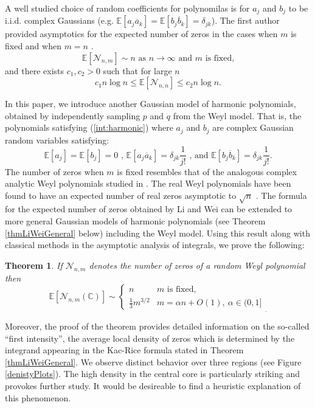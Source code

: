 \documentclass[12pt]{amsart}
\newtheorem{theorem}{Theorem}
\theoremstyle{remark}
\begin{document}
A well studied choice  of random coefficients for polynomilas is for $a_j$ and $b_j$ to be i.i.d. complex Gaussians (e.g. $\mathbb{E}[a_j\overline{a}_k]=\mathbb{E}[b_j\overline{b}_k]=\delta_{jk}$).  The first author provided asymptotics for the expected number of zeros in the cases when $m$ is fixed and when $m = n$ \cite{Thomack}.
\[\mathbb{E}[\mathcal{N}_{n,m}]\sim n\text{ as $n\rightarrow\infty$ and $m$ is fixed,}\] 
and there exists $c_1,c_2>0$ such that for large $n$
\[c_1n\log n\le\mathbb{E}[\mathcal{N}_{n,n}]\le c_2n\log n.\]

In this paper, we introduce another Gaussian model of harmonic polynomials, obtained by independently sampling $p$ and $q$ from the Weyl model.  That is, the polynomials satisfying (\ref{int:harmonic}) where $a_j$ and $b_j$ are complex Gaussian random variables satisfying:
\begin{equation}
	\mathbb{E}[a_j]=\mathbb{E}[b_j]=0\text{ , }\mathbb{E}[a_j\overline{a}_k]
	=\delta_{jk}\frac{1}{j!}\text{ , and }\mathbb{E}[b_j\overline{b}_k]
	=\delta_{jk}\frac{1}{j!}.
\end{equation}
The number of zeros when $m$ is fixed resembles that of the analogous complex analytic Weyl polynomials studied in \cite{Tao}.  The real Weyl polynomials have been found to have an expected number of real zeros asymptotic to $\sqrt{n}$ \cite{Kostlan}.
The formula for the expected number of zeros obtained by Li and Wei can be extended to more general Gaussian models of harmonic polynomials (see Theorem  \ref{thmLiWeiGeneral} below) including the Weyl model.  Using this result along with classical methods in the asymptotic analysis of integrals, we prove the following:
\begin{theorem}\label{MainResult}
	If $\mathcal{N}_{n,m}$ denotes the number of zeros of a random Weyl polynomial then
	\begin{equation}
		\label{MainThm}
		\mathbb{E}\left[\mathcal{N}_{n,m}(\mathbb{C})\right]\sim\left\{
		\begin{array}{ll}
			n&m\text{ is fixed,}
			\\\frac{1}{3}m^{3/2}&m=\alpha n+O(1),\ \alpha\in(0,1]
		\end{array}\right._.
	\end{equation}
\end{theorem}
Moreover, the proof of the theorem provides detailed information on the so-called ``first intensity'', the average local density of zeros which is determined by the integrand appearing in the Kac-Rice formula stated in Theorem \ref{thmLiWeiGeneral}.  We observe distinct behavior over three regions (see Figure \ref{denistyPlots}).  The high density in the central core is particularly striking and provokes further study.  It would be desireable to find a heuristic explanation of this phenomenon.
\end{document}
